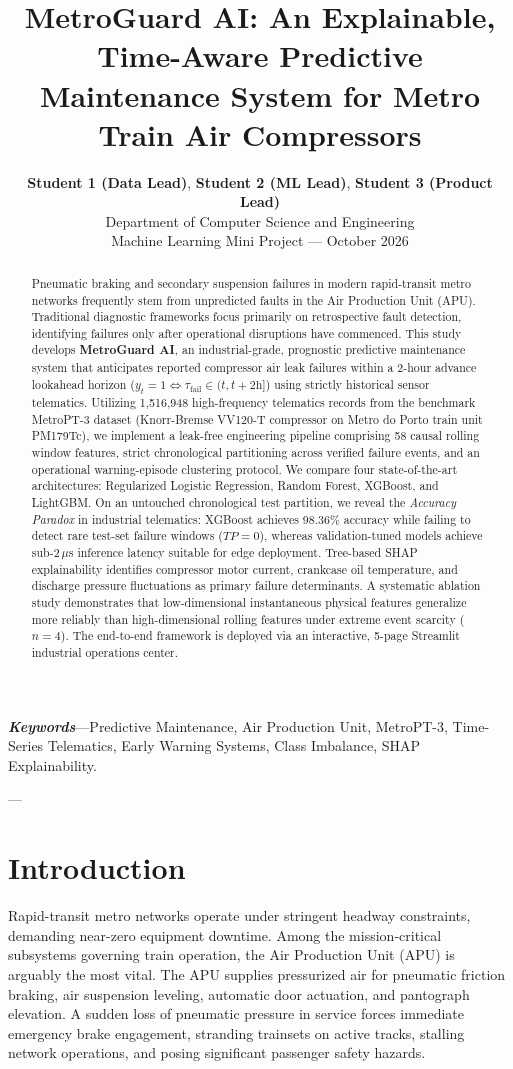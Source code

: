 \documentclass[10pt,twocolumn,a4paper]{article}
\title{\textbf{MetroGuard AI: An Explainable, Time-Aware Predictive Maintenance System for Metro Train Air Compressors}}
\author{
    \textbf{Student 1 (Data Lead)}, \textbf{Student 2 (ML Lead)}, \textbf{Student 3 (Product Lead)} \\
    Department of Computer Science and Engineering \\
    Machine Learning Mini Project --- October 2026
}
\date{}
\begin{document}
\maketitle

\begin{abstract}
Pneumatic braking and secondary suspension failures in modern rapid-transit metro networks frequently stem from unpredicted faults in the Air Production Unit (APU). Traditional diagnostic frameworks focus primarily on retrospective fault detection, identifying failures only after operational disruptions have commenced. This study develops \textbf{MetroGuard AI}, an industrial-grade, prognostic predictive maintenance system that anticipates reported compressor air leak failures within a 2-hour advance lookahead horizon ($y_t = 1 \iff \tau_{\text{fail}} \in (t, t+2\text{h}]$) using strictly historical sensor telematics. Utilizing 1,516,948 high-frequency telematics records from the benchmark MetroPT-3 dataset (Knorr-Bremse VV120-T compressor on Metro do Porto train unit PM179Tc), we implement a leak-free engineering pipeline comprising 58 causal rolling window features, strict chronological partitioning across verified failure events, and an operational warning-episode clustering protocol. We compare four state-of-the-art architectures: Regularized Logistic Regression, Random Forest, XGBoost, and LightGBM. On an untouched chronological test partition, we reveal the \textit{Accuracy Paradox} in industrial telematics: XGBoost achieves 98.36\% accuracy while failing to detect rare test-set failure windows ($TP = 0$), whereas validation-tuned models achieve sub-2\,$\mu$s inference latency suitable for edge deployment. Tree-based SHAP explainability identifies compressor motor current, crankcase oil temperature, and discharge pressure fluctuations as primary failure determinants. A systematic ablation study demonstrates that low-dimensional instantaneous physical features generalize more reliably than high-dimensional rolling features under extreme event scarcity ($n=4$). The end-to-end framework is deployed via an interactive, 5-page Streamlit industrial operations center.
\end{abstract}

\textbf{\textit{Keywords}}---Predictive Maintenance, Air Production Unit, MetroPT-3, Time-Series Telematics, Early Warning Systems, Class Imbalance, SHAP Explainability.

---

\section{Introduction}
Rapid-transit metro networks operate under stringent headway constraints, demanding near-zero equipment downtime. Among the mission-critical subsystems governing train operation, the Air Production Unit (APU) is arguably the most vital. The APU supplies pressurized air for pneumatic friction braking, air suspension leveling, automatic door actuation, and pantograph elevation. A sudden loss of pneumatic pressure in service forces immediate emergency brake engagement, stranding trainsets on active tracks, stalling network operations, and posing significant passenger safety hazards.
\end{document}
